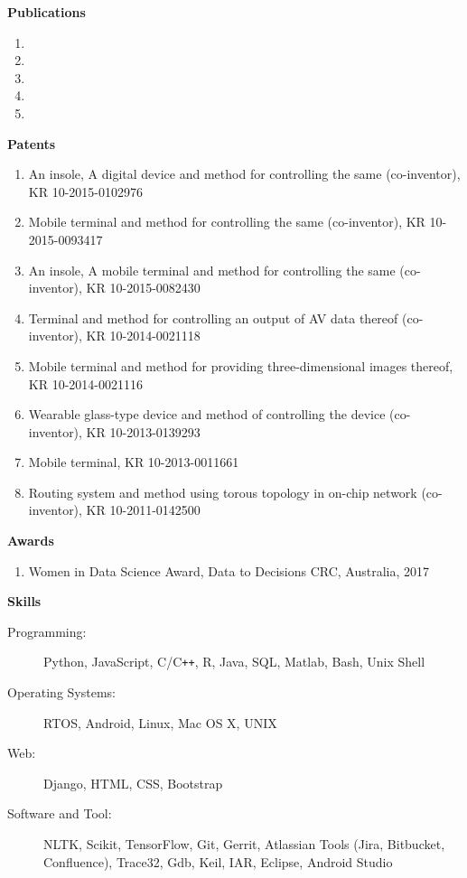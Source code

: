 \documentclass[letterpaper,11pt]{article}
\newcommand{\resheading}[1]{{\large \colorbox{mygrey}{\begin{minipage}{\textwidth}{\textbf{#1 \vphantom{p\^{E}}}}\end{minipage}}}}
\begin{document}
\pagebreak



\resheading{Publications}
    \begin{enumerate}
        \item {}
        \item {}
        \item {}
        \item {}
        \item {}
    \end{enumerate}


\resheading{Patents}
    \begin{enumerate}
        \item An insole, A digital device and method for controlling the same (co-inventor), KR 10-2015-0102976
        \item Mobile terminal and method for controlling the same (co-inventor), KR 10-2015-0093417
        \item An insole, A mobile terminal and method for controlling the same (co-inventor), KR 10-2015-0082430
        \item Terminal and method for controlling an output of AV data thereof (co-inventor), KR 10-2014-0021118
        \item Mobile terminal and method for providing three-dimensional images thereof, KR 10-2014-0021116
        \item Wearable glass-type device and method of controlling the device (co-inventor), KR 10-2013-0139293
        \item Mobile terminal, KR 10-2013-0011661
        \item Routing system and method using torous topology in on-chip network (co-inventor), KR 10-2011-0142500
    \end{enumerate}

\resheading{Awards}
    \begin{enumerate}
        \item Women in Data Science Award, Data to Decisions CRC, Australia, 2017
    \end{enumerate}

\resheading{Skills}

\begin{description}
    \item[Programming:] Python, JavaScript, C/C{}\verb!++!, R, Java, SQL, Matlab, Bash, Unix Shell
    \item[Operating Systems:] RTOS, Android, Linux, Mac OS X, {\sc UNIX}
    \item[Web:] Django, HTML, CSS, Bootstrap
    \item[Software and Tool:] NLTK, Scikit, TensorFlow, Git, Gerrit, Atlassian Tools (Jira, Bitbucket, Confluence), Trace32, Gdb, Keil, IAR, Eclipse, Android Studio
\end{description}
\end{document}
